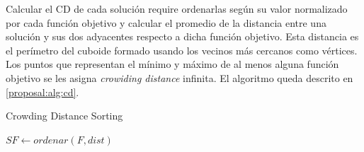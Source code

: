 Calcular el CD de cada soluci\'on require ordenarlas seg\'un su valor normalizado por cada funci\'on objetivo y calcular el promedio de la distancia entre una soluci\'on y sus dos adyacentes respecto a dicha funci\'on objetivo. Esta distancia es el per\'imetro del cuboide formado usando los vecinos m\'as cercanos como v\'ertices. Los puntos que representan el m\'inimo y m\'aximo de al menos alguna funci\'on objetivo se les asigna \textit{crowiding distance} infinita. El  algoritmo queda descrito en \ref{proposal:alg:cd}.

\begin{algorithm*}[ht]
    \caption{Crowding Distance Sorting}
    \label{proposal:alg:cd}


    $SF \gets ordenar(F, dist)$ 
\end{algorithm*}





